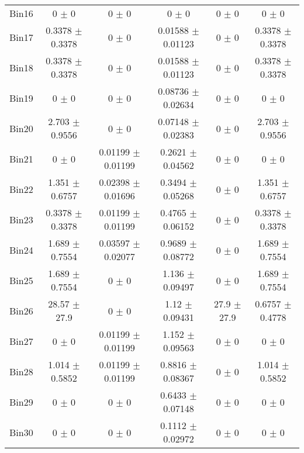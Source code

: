 \begin{tabular}{@{\extracolsep{4pt}}lccccc@{}}
     Bin16 & 0 $\pm$ 0 & 0 $\pm$ 0 & 0 $\pm$ 0 & 0 $\pm$ 0 & 0 $\pm$ 0 \\ 
     Bin17 & 0.3378 $\pm$ 0.3378 & 0 $\pm$ 0 & 0.01588 $\pm$ 0.01123 & 0 $\pm$ 0 & 0.3378 $\pm$ 0.3378 \\ 
     Bin18 & 0.3378 $\pm$ 0.3378 & 0 $\pm$ 0 & 0.01588 $\pm$ 0.01123 & 0 $\pm$ 0 & 0.3378 $\pm$ 0.3378 \\ 
     Bin19 & 0 $\pm$ 0 & 0 $\pm$ 0 & 0.08736 $\pm$ 0.02634 & 0 $\pm$ 0 & 0 $\pm$ 0 \\ 
     Bin20 & 2.703 $\pm$ 0.9556 & 0 $\pm$ 0 & 0.07148 $\pm$ 0.02383 & 0 $\pm$ 0 & 2.703 $\pm$ 0.9556 \\ 
     Bin21 & 0 $\pm$ 0 & 0.01199 $\pm$ 0.01199 & 0.2621 $\pm$ 0.04562 & 0 $\pm$ 0 & 0 $\pm$ 0 \\ 
     Bin22 & 1.351 $\pm$ 0.6757 & 0.02398 $\pm$ 0.01696 & 0.3494 $\pm$ 0.05268 & 0 $\pm$ 0 & 1.351 $\pm$ 0.6757 \\ 
     Bin23 & 0.3378 $\pm$ 0.3378 & 0.01199 $\pm$ 0.01199 & 0.4765 $\pm$ 0.06152 & 0 $\pm$ 0 & 0.3378 $\pm$ 0.3378 \\ 
     Bin24 & 1.689 $\pm$ 0.7554 & 0.03597 $\pm$ 0.02077 & 0.9689 $\pm$ 0.08772 & 0 $\pm$ 0 & 1.689 $\pm$ 0.7554 \\ 
     Bin25 & 1.689 $\pm$ 0.7554 & 0 $\pm$ 0 & 1.136 $\pm$ 0.09497 & 0 $\pm$ 0 & 1.689 $\pm$ 0.7554 \\ 
     Bin26 & 28.57 $\pm$ 27.9 & 0 $\pm$ 0 & 1.12 $\pm$ 0.09431 & 27.9 $\pm$ 27.9 & 0.6757 $\pm$ 0.4778 \\ 
     Bin27 & 0 $\pm$ 0 & 0.01199 $\pm$ 0.01199 & 1.152 $\pm$ 0.09563 & 0 $\pm$ 0 & 0 $\pm$ 0 \\ 
     Bin28 & 1.014 $\pm$ 0.5852 & 0.01199 $\pm$ 0.01199 & 0.8816 $\pm$ 0.08367 & 0 $\pm$ 0 & 1.014 $\pm$ 0.5852 \\ 
     Bin29 & 0 $\pm$ 0 & 0 $\pm$ 0 & 0.6433 $\pm$ 0.07148 & 0 $\pm$ 0 & 0 $\pm$ 0 \\ 
     Bin30 & 0 $\pm$ 0 & 0 $\pm$ 0 & 0.1112 $\pm$ 0.02972 & 0 $\pm$ 0 & 0 $\pm$ 0 \\ 
\hline\hline
  \end{tabular}
